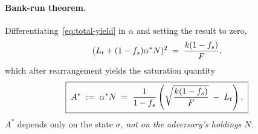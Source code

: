 \paragraph{Bank-run theorem.} Differentiating~\eqref{eq:total-yield} in $\alpha$ and setting the result to zero,
\begin{equation}
(L_t + (1 - f_s) \alpha^* N)^2 \;=\; \frac{k (1 - f_s)}{F},
\label{eq:foc}
\end{equation}
which after rearrangement yields the saturation quantity
\begin{equation}
\boxed{\;A^* \;:=\; \alpha^* N \;=\; \frac{1}{1 - f_s}\left(\sqrt{\frac{k (1 - f_s)}{F}} \;-\; L_t\right).\;}
\label{eq:saturation}
\end{equation}
$A^*$ depends only on the state $\sigma$, \emph{not on the adversary's holdings $N$.}

